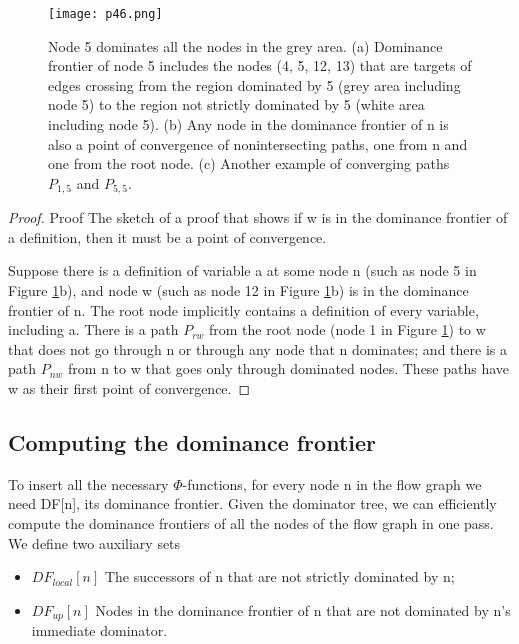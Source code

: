 \begin{figure}[htb]
	\centering
	\texttt{[image: p46.png]}
	\caption{Node 5 dominates all the nodes in the grey area. (a) Dominance frontier of node 5 includes the nodes (4, 5, 12, 13) that are targets of edges crossing from the region dominated by 5 (grey area including node 5) to the region not strictly dominated by 5 (white area including node 5). (b) Any node in the dominance frontier of n is also a point of convergence of nonintersecting paths, one from n and one from the root node. (c) Another example of converging paths $P_{1,5}$ and $P_{5,5}$.}
	\label{fig:p46}

\end{figure}


\begin{proof}{Proof}
	The sketch of a proof that shows if w is in the dominance frontier of a definition, then it must be a point of convergence.

	Suppose there is a definition of variable a at some node n (such as node 5 in Figure  \ref{fig:p46}b), and node w (such as node 12 in Figure  \ref{fig:p46}b) is in the dominance frontier of n. The root node implicitly contains a definition of every variable, including a. There is a path $P_{rw}$ from the root node (node 1 in Figure \ref{fig:p46}) to w that does not go through n or through any node that n dominates; and there is a path $P_{nw}$ from n to w that goes only through dominated nodes. These paths have w as their first point of convergence.
\end{proof}


\subsection{Computing the dominance frontier}

To insert all the necessary $\Phi$-functions, for every node n in the flow graph we need DF[n], its dominance frontier. Given the dominator tree, we can efficiently compute the dominance frontiers of all the nodes of the flow graph in one pass. We define two auxiliary sets

\begin{itemize}
	\item $DF_{local}[n]$ The successors of n that are not strictly dominated by n;
	\item $DF_{up}[n]$ Nodes in the dominance frontier of n that are not dominated by n’s immediate dominator.
\end{itemize}

